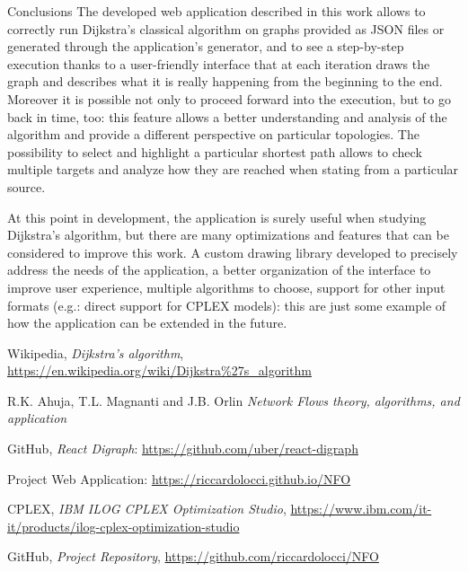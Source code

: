 \documentclass[9pt]{extarticle}
\begin{document}
    \begin{section}{Conclusions}
        The developed web application described in this work allows to correctly run Dijkstra's classical algorithm on graphs provided as JSON files or generated
        through the application's generator, and to see a step-by-step execution thanks to a user-friendly interface that at each iteration draws the graph and 
        describes what it is really happening from the beginning to the end. 
        Moreover it is possible not only to proceed forward into the execution, but to go back in time, too: this feature allows a better understanding and analysis 
        of the algorithm and provide a different perspective on particular topologies. 
        The possibility to select and highlight a particular shortest path allows to check multiple targets and analyze how they are reached when stating from a 
        particular source. 

        At this point in development, the application is surely useful when studying Dijkstra's algorithm, but there are many optimizations and features
        that can be considered to improve this work. 
        A custom drawing library developed to precisely address the needs of the application, a better organization of the interface to improve user experience, 
        multiple algorithms to choose, support for other input formats (e.g.: direct support for CPLEX models): this are just some example of how the application 
        can be extended in the future.
    \end{section}

    \begin{thebibliography}{6}

        Wikipedia,
        \textit{Dijkstra's algorithm},
        \url{https://en.wikipedia.org/wiki/Dijkstra%27s_algorithm}
        
        R.K. Ahuja, T.L. Magnanti and J.B. Orlin
        \textit{ Network Flows theory, algorithms, and application}

        GitHub,
        \textit{React Digraph}:
        \url{https://github.com/uber/react-digraph}

        Project Web Application: \url{https://riccardolocci.github.io/NFO}
        
        CPLEX,
        \textit{IBM ILOG CPLEX Optimization Studio},
        \url{https://www.ibm.com/it-it/products/ilog-cplex-optimization-studio}

        GitHub,
        \textit{Project Repository},
        \url{https://github.com/riccardolocci/NFO}

    \end{thebibliography}
\end{document}
